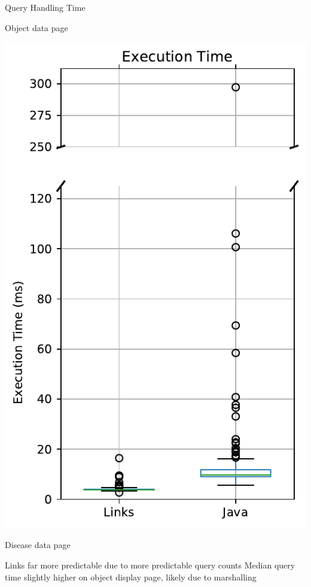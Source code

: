 \documentclass[11.5pt, aspectratio=169]{beamer}
\begin{document}
\begin{frame}{Query Handling Time}
\begin{minipage}[t]{0.45\textwidth}
    \begin{center}
      Object data page
    \end{center}
  \end{minipage}
  \hfill
  \begin{minipage}[t]{0.45\textwidth}
    \centering
    \includegraphics[scale=0.4]{images/diseasedisplay_querytime_box.pdf}

    \begin{center}
      Disease data page
    \end{center}
  \end{minipage}
  \vspace{1em}

  \begin{fullpageitemize}
  \itemR Links far more predictable due to more predictable query counts
  \itemR Median query time slightly higher on object display page, likely due to marshalling
  \end{fullpageitemize}
\end{frame}
\end{document}

